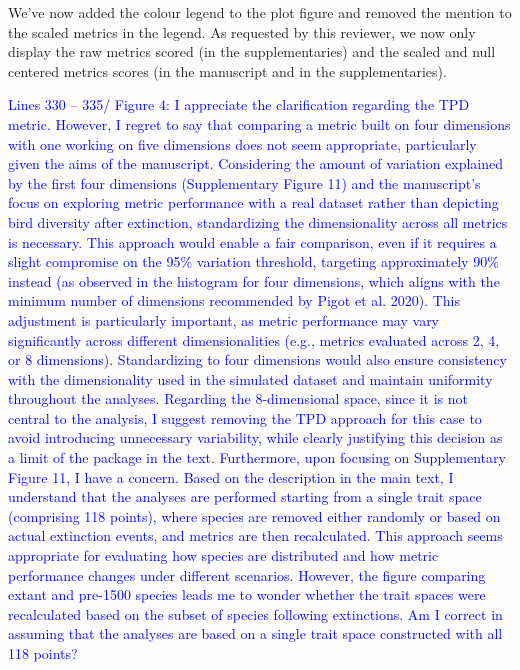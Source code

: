 \documentclass[
]{article}
\begin{document}
We've now added the colour legend to the plot figure and removed the mention to the scaled metrics in the legend.
As requested by this reviewer, we now only display the raw metrics scored (in the supplementaries) and the scaled and null centered metrics scores (in the manuscript and in the supplementaries).

\textcolor{blue}{Lines 330 – 335/ Figure 4: I appreciate the clarification regarding the TPD metric.
However, I regret to say that comparing a metric built on four dimensions with one working on five dimensions does not seem appropriate, particularly given the aims of the manuscript.
Considering the amount of variation explained by the first four dimensions (Supplementary Figure 11) and the manuscript's focus on exploring metric performance with a real dataset rather than depicting bird diversity after extinction, standardizing the dimensionality across all metrics is necessary.
This approach would enable a fair comparison, even if it requires a slight compromise on the 95\% variation threshold, targeting approximately 90\% instead (as observed in the histogram for four dimensions, which aligns with the minimum number of dimensions recommended by Pigot et al. 2020).
This adjustment is particularly important, as metric performance may vary significantly across different dimensionalities (e.g., metrics evaluated across 2, 4, or 8 dimensions).
Standardizing to four dimensions would also ensure consistency with the dimensionality used in the simulated dataset and maintain uniformity throughout the analyses.
Regarding the 8-dimensional space, since it is not central to the analysis, I suggest removing the TPD approach for this case to avoid introducing unnecessary variability, while clearly justifying this decision as a limit of the package in the text.
Furthermore, upon focusing on Supplementary Figure 11, I have a concern.
Based on the description in the main text, I understand that the analyses are performed starting from a single trait space (comprising 118 points), where species are removed either randomly or based on actual extinction events, and metrics are then recalculated.
This approach seems appropriate for evaluating how species are distributed and how metric performance changes under different scenarios.
However, the figure comparing extant and pre-1500 species leads me to wonder whether the trait spaces were recalculated based on the subset of species following extinctions.
Am I correct in assuming that the analyses are based on a single trait space constructed with all 118 points?}
\end{document}
